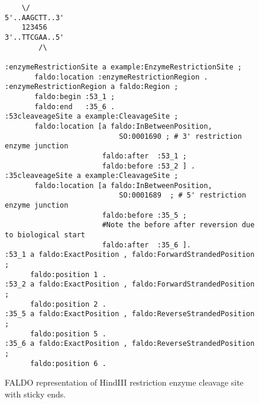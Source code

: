 \begin{figure}
\begin{shaded}
\small
\begin{verbatim}
    \/
5'..AAGCTT..3' 
    123456
3'..TTCGAA..5'
        /\
        
:enzymeRestrictionSite a example:EnzymeRestrictionSite ;
       faldo:location :enzymeRestrictionRegion .
:enzymeRestrictionRegion a faldo:Region ;
       faldo:begin :53_1 ;
       faldo:end   :35_6 .
:53cleaveageSite a example:CleavageSite ;
       faldo:location [a faldo:InBetweenPosition, 
                           SO:0001690 ; # 3' restriction enzyme junction 
                       faldo:after  :53_1 ;        
                       faldo:before :53_2 ] .
:35cleaveageSite a example:CleavageSite ;
       faldo:location [a faldo:InBetweenPosition, 
                           SO:0001689  ; # 5' restriction enzyme junction 
                       faldo:before :35_5 ;
                       #Note the before after reversion due to biological start 
                       faldo:after  :35_6 ]. 
:53_1 a faldo:ExactPosition , faldo:ForwardStrandedPosition ;
      faldo:position 1 .
:53_2 a faldo:ExactPosition , faldo:ForwardStrandedPosition ;
      faldo:position 2 .
:35_5 a faldo:ExactPosition , faldo:ReverseStrandedPosition ;
      faldo:position 5 .
:35_6 a faldo:ExactPosition , faldo:ReverseStrandedPosition ;
      faldo:position 6 .
\end{verbatim}
\end{shaded}
\caption{FALDO representation of HindIII restriction enzyme cleavage site with sticky ends.}
\label{fig:HindIII}
\end{figure}





